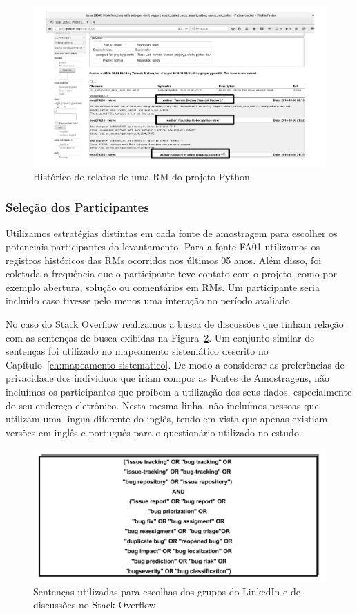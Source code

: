 \begin{figure}[htpb]
	\centering
	\includegraphics[width=0.7\linewidth]{./chapter-pesquisa-com-profissionais/img/historico-rm-python.pdf}
	\caption{Histórico de relatos de uma RM do projeto Python}\label{fig:historico-rm-python}
\end{figure}

\subsubsection{Seleção dos Participantes}\label{subsubsec:pesquisa_profissionais_plano_pesquisa}

Utilizamos estratégias distintas em cada fonte de amostragem para escolher os
potenciais participantes do levantamento. Para a fonte FA01 utilizamos os
registros históricos das RMs ocorridos nos últimos 05 anos. Além disso, foi
coletada a frequência que o participante teve contato com o projeto, como por
exemplo abertura, solução ou comentários em RMs. Um participante seria incluído
caso tivesse pelo menos uma interação no período avaliado.

No caso do Stack Overflow realizamos a busca de discussões que tinham relação
com as sentenças de busca exibidas na Figura~\ref{fig:setencas-grupos}. Um
conjunto similar de sentenças foi utilizado no mapeamento sistemático descrito
no Capítulo~\ref{ch:mapeamento-sistematico}. De modo a considerar as
preferências de privacidade dos indivíduos que iriam compor as Fontes de
Amostragens, não incluímos os participantes que proíbem a utilização dos seus
dados, especialmente do seu endereço eletrônico. Nesta mesma linha, não
incluímos pessoas que utilizam uma língua diferente do inglês, tendo em vista
que apenas existiam versões em inglês e português para o questionário utilizado
no estudo.

\begin{figure}[htpb]
	\centering
	\includegraphics[width=0.7\linewidth]{./chapter-pesquisa-com-profissionais/img/setencas-grupos.pdf}
	\caption{Sentenças utilizadas para escolhas dos grupos do LinkedIn e de
		discussões no Stack Overflow}\label{fig:setencas-grupos}
\end{figure}


